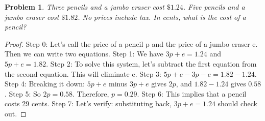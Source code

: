 \documentclass{article}
\newtheorem{theorem}{Problem}
\begin{document}
\begin{theorem}
Three pencils and a jumbo eraser cost $\$1.24$. Five pencils and a jumbo eraser cost $\$1.82$. No prices include tax. In cents, what is the cost of a pencil?
\end{theorem}

\begin{proof}
Step 0: Let's call the price of a pencil p and the price of a jumbo eraser e. Then we can write two equations.
Step 1: We have $3p+e=1.24$ and $5p+e=1.82$.
Step 2: To solve this system, let's subtract the first equation from the second equation. This will eliminate e.
Step 3: $5p+e-3p-e=1.82-1.24$.
Step 4: Breaking it down: $5p + e$ minus $3p + e$ gives $2p$, and $1.82 - 1.24$ gives $0.58$.
Step 5: So $2p=0.58$. Therefore, $p=0.29$.
Step 6: This implies that a pencil costs 29 cents.
Step 7: Let's verify: substituting back, $3p+e=1.24$ should check out.
\end{proof}
\end{document}
